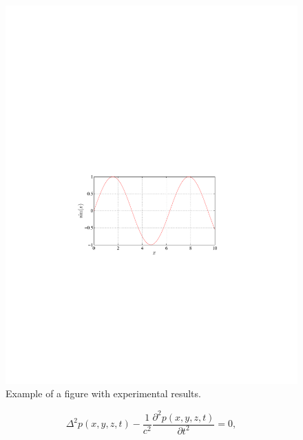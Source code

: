 \documentclass{article}
\begin{document}
\begin{sloppy}
\begin{figure}[t]
  \centering
  \centerline{\includegraphics[width=\columnwidth]{fig1a}}
  \caption{Example of a figure with experimental results.}
  \label{fig:results}
\end{figure}

\begin{equation}
  \label{eqn:wave_equation}
    \Delta^2p(x,y,z,t)-
    \displaystyle\frac{1}{c^2}\frac{\partial^2p(x,y,z,t)}{\partial t^2}=0,
\end{equation}




\end{sloppy}
\end{document}
